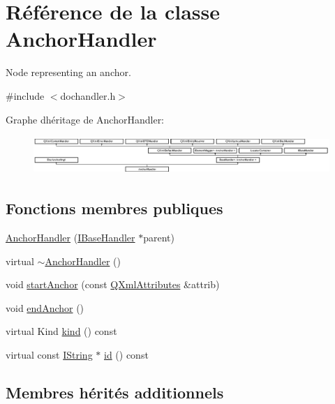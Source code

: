\hypertarget{class_anchor_handler}{}\section{Référence de la classe Anchor\+Handler}
\label{class_anchor_handler}


Node representing an anchor.  




{\ttfamily \#include $<$dochandler.\+h$>$}

Graphe d\textquotesingle{}héritage de Anchor\+Handler\+:\begin{figure}[H]
\begin{center}
\leavevmode
\includegraphics[height=1.461187cm]{class_anchor_handler}
\end{center}
\end{figure}
\subsection*{Fonctions membres publiques}
\begin{DoxyCompactItemize}
\item 
\hyperlink{class_anchor_handler_a7fd18137b2ef43f182b1946c37f21bb8}{Anchor\+Handler} (\hyperlink{class_i_base_handler}{I\+Base\+Handler} $\ast$parent)
\item 
virtual \hyperlink{class_anchor_handler_a54b76b5a2db1f3f096468f6ae4b08148}{$\sim$\+Anchor\+Handler} ()
\item 
void \hyperlink{class_anchor_handler_aa7706556e4685c8e41fc2612491645a0}{start\+Anchor} (const \hyperlink{class_q_xml_attributes}{Q\+Xml\+Attributes} \&attrib)
\item 
void \hyperlink{class_anchor_handler_a373370ed61d2242725fc580c7babc23e}{end\+Anchor} ()
\item 
virtual Kind \hyperlink{class_anchor_handler_a03610d3b05b9103d3617af57c2ef75d6}{kind} () const 
\item 
virtual const \hyperlink{class_i_string}{I\+String} $\ast$ \hyperlink{class_anchor_handler_a0b1f90e563db6aaa81b00513a3f05551}{id} () const 
\end{DoxyCompactItemize}
\subsection*{Membres hérités additionnels}


